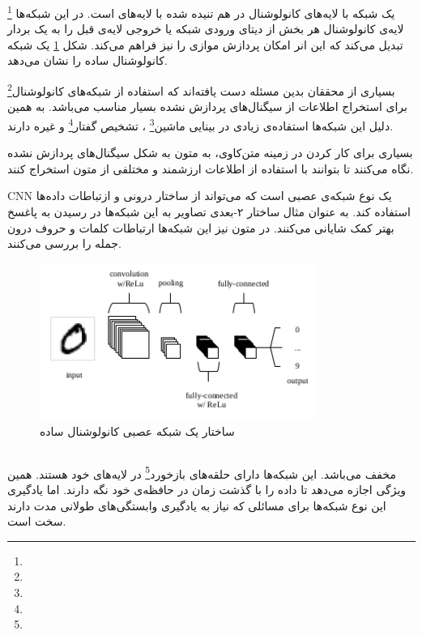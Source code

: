 \documentclass[12pt, a4paper, oneside]{report}
\begin{document}
\footnote{}
یک شبکه
با لایه‌های کانولوشنال در هم تنیده شده با لایه‌های
است. در این شبکه‌ها لایه‌ی کانولوشنال هر بخش از دیتای ورودی شبکه یا خروجی لایه‌ی قبل را به یک بردار 
تبدیل می‌کند که این انر امکان پردازش موازی را نیز فراهم می‌کند\cite{iyyer-etal-2015-deep}. شکل
\ref{fig:cnn}
یک شبکه کانولوشنال ساده را نشان می‌دهد.

بسیاری از محققان بدین مسئله دست یافته‌اند که استفاده از 
شبکه‌های کانولوشنال\footnote{}
برای استخراج اطلاعات از سیگنال‌های پردازش نشده بسیار مناسب می‌باشد. به همین دلیل این شبکه‌ها
استفاده‌ی زیادی در
بینایی ماشین\footnote{}
،
تشخیص گفتار\footnote{}
و غیره دارند\cite{c9d4fbeac7324056bed5d1cb262a7268}.

بسیاری برای کار کردن در زمینه متن‌کاوی، به متون به شکل سیگنال‌های پردازش نشده نگاه می‌کنند
تا بتوانند با استفاده از
اطلاعات ارزشمند و مختلفی از متون استخراج کنند\cite{c9d4fbeac7324056bed5d1cb262a7268}.

CNN 
یک نوع شبکه‌ی عصبی است که می‌تواند از ساختار درونی و ازتباطات داده‌ها استفاده کند.
به عنوان مثال ساختار ۲-بعدی تصاویر به این شبکه‌ها در رسیدن به پاغسخ بهتر کمک شایانی می‌کنند.
در متون نیز این شبکه‌ها ارتباطات کلمات و حروف درون جمله را بررسی می‌کنند.
\cite{johnson-zhang-2015-effective}

\begin{figure}[!ht]
    \centering
    \includegraphics[width=0.80\textwidth]{CNN}
    \caption{ساختار یک شبکه عصبی کانولوشنال ساده}
    \label{fig:cnn}
\end{figure}

\subsection{}

مخفف
می‌باشد. این شبکه‌ها دارای حلقه‌های
بازخورد\footnote{}
در لایه‌های خود هستند. همین ویژگی اجازه می‌دهد تا داده را با گذشت زمان در حافظه‌ی خود نگه دارند.
اما یادگیری این نوع شبکه‌ها برای مسائلی که نیاز به یادگیری وابستگی‌های طولانی مدت دارند سخت است.
\end{document}
